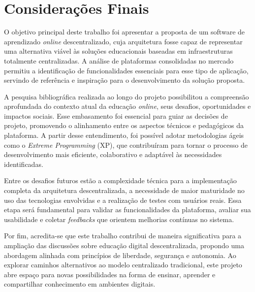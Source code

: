 \chapter[Considerações Finais]{Considerações Finais}
\label{cap:consideracoes}

O objetivo principal deste trabalho foi apresentar a proposta de um software de aprendizado \textit{online} descentralizado, cuja arquitetura fosse capaz de representar uma alternativa viável às soluções educacionais baseadas em infraestruturas totalmente centralizadas. A análise de plataformas consolidadas no mercado permitiu a identificação de funcionalidades essenciais para esse tipo de aplicação, servindo de referência e inspiração para o desenvolvimento da solução proposta.

A pesquisa bibliográfica realizada ao longo do projeto possibilitou a compreensão aprofundada do contexto atual da educação \textit{online}, seus desafios, oportunidades e impactos sociais. Esse embasamento foi essencial para guiar as decisões de projeto, promovendo o alinhamento entre os aspectos técnicos e pedagógicos da plataforma. A partir desse entendimento, foi possível adotar metodologias ágeis como o \textit{Extreme Programming} (XP), que contribuíram para tornar o processo de desenvolvimento mais eficiente, colaborativo e adaptável às necessidades identificadas.

Entre os desafios futuros estão a complexidade técnica para a implementação completa da arquitetura descentralizada, a necessidade de maior maturidade no uso das tecnologias envolvidas e a realização de testes com usuários reais. Essa etapa será fundamental para validar as funcionalidades da plataforma, avaliar sua usabilidade e coletar \textit{feedbacks} que orientem melhorias contínuas no sistema.

Por fim, acredita-se que este trabalho contribui de maneira significativa para a ampliação das discussões sobre educação digital descentralizada, propondo uma abordagem alinhada com princípios de liberdade, segurança e autonomia. Ao explorar caminhos alternativos ao modelo centralizado tradicional, este projeto abre espaço para novas possibilidades na forma de ensinar, aprender e compartilhar conhecimento em ambientes digitais.
